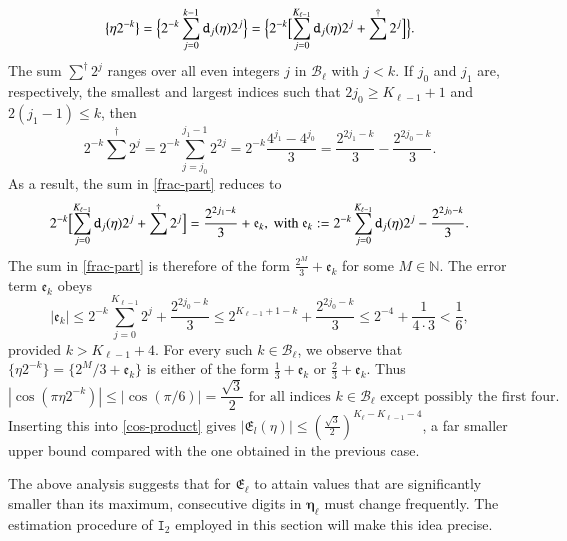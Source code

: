 \documentclass[12pt, twoside]{article}
\theoremstyle{definition}
\numberwithin{equation}{section}
\begin{document}
\begin{itemize}
\begin{equation}
\bigl\{\eta 2^{-k} \bigr\} = \Bigl\{ 2^{-k} \sum_{j=0}^{k-1} \mathtt d_j(\eta) 2^j \Bigr\} = \Bigl\{ 2^{-k} \Bigl[ \sum_{j=0}^{K_{\ell-1}} \mathtt d_j(\eta) 2^j + \sum^{\dagger} 2^{j}\Bigr] \Bigr\}. \label{frac-part}   
\end{equation} 
The sum ${\overset{\dagger}{\sum}} 2^j$ ranges over all  even integers $j$ in $\mathcal B_{\ell}$ with $j < k$. If $j_0$ and $j_1$ are, respectively, the smallest and largest indices such that $2j_0 \geq K_{\ell-1}+1$ and $2(j_1-1) \leq k$, then 
\begin{equation} 2^{-k} {\overset{\dagger}{\sum}} 2^j = 2^{-k} \sum_{j=j_0}^{j_1-1} 2^{2j} = 2^{-k} \frac{4^{j_1} - 4^{j_0}}{3} = \frac{2^{2j_1-k}}{3} - \frac{2^{2j_0-k}}{3}. \end{equation}  
As a result, the sum in \eqref{frac-part} reduces to 
\[ 2^{-k} \Bigl[ \sum_{j=0}^{K_{\ell-1}} \mathtt d_j(\eta) 2^j + \sum^{\dagger} 2^{j} \Bigr] = \frac{2^{2j_1-k}}{3} + \mathfrak e_k, \text{ with } \mathfrak e_k :=  2^{-k} \sum_{j=0}^{K_{\ell-1}} \mathtt d_j(\eta) 2^j  - \frac{2^{2j_0-k}}{3}. \]
The sum in \eqref{frac-part} is therefore  of the form $\frac{2^M}{3} + \mathfrak e_k$ for some $M \in \mathbb N$. The error term $\mathfrak e_k$ obeys 
\[ \bigl| \mathfrak e_k \bigr| \leq 2^{-k} \sum_{j=0}^{K_{\ell-1}} 2^j + \frac{2^{2j_0-k}}{3} \leq 2^{K_{\ell-1}+1-k} + \frac{2^{2j_0-k}}{3} \leq    2^{-4} + \frac{1}{4 \cdot 3} < \frac{1}{6}, \] 
provided $k > K_{\ell-1} +4$. For every such $k \in \mathcal B_{\ell}$, we observe that $\{\eta 2^{-k}\} = \{2^{M}/3 + \mathfrak e_k \}$ is either of the form $\frac{1}{3} + \mathfrak e_k$ or $\frac{2}{3} + \mathfrak e_k$. Thus  
\[ |\cos(\pi \eta 2^{-k})| \leq |\cos({\pi}/{6})| = \frac{\sqrt{3}}{2} \text{ for all indices $k \in \mathcal B_{\ell}$ except possibly the first four.} \]  Inserting this into \eqref{cos-product} gives $|\mathfrak E_l(\eta)| \leq (\frac{\sqrt{3}}{2})^{K_{\ell} - K_{\ell-1}-4}$, a far smaller upper bound compared with the one obtained in the previous case.  
\end{itemize} 
The above analysis suggests that for $\mathfrak E_{\ell}$ to attain values that are significantly smaller than its maximum, consecutive digits in $\pmb{\eta}_{\ell}$ must change frequently.  The estimation procedure of $\mathtt I_2$ employed in this section will make this idea precise. 
\end{document}
